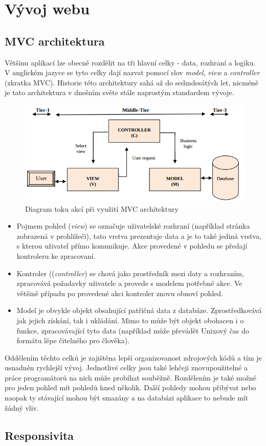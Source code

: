 \section{Vývoj webu}
\subsection{MVC architektura}
Většinu aplikací lze obecně rozdělit na tři hlavní celky - data, rozhraní a logiku. V anglickém jazyce se tyto celky dají nazvat pomocí slov \emph{model}, \emph{view} a \emph{controller} (zkratka MVC). Historie této architektury sahá až do sedmdesátých let, nicméně je tato architektura v dnešním světe stále naprostým standardem vývoje.

\begin{figure}[H]
	\centering
	\includegraphics[width=\textwidth]{images/mvc.png}
	\caption{Diagram toku akcí při využití MVC architektury}
	\label{mvc}
\end{figure}

\begin{itemize}
\item Pojmem pohled (\emph{view}) se označuje uživatelské rozhraní (například stránka zobrazená v prohlížeči), tato vrstva prezentuje data a je to také jediná vrstva, s kterou uživatel přímo komunikuje. Akce provedené v pohledu se předají kontroleru ke zpracovaní.
\item Kontroler ((\emph{controller}) se chová jako prostředník mezi daty a rozhraním, zpracovává požadavky uživatele a provede s modelem potřebné akce. Ve většině případu po provedené akci kontroler znovu obnoví pohled.
\item Model je obvykle objekt obsahující patřičná data z databáze. Zprostředkovává jak jejich získání, tak i ukládání. Mimo to může být objekt obohacen i o funkce, zpracovávající tyto data (například může převádět Unixový čas do formátu lépe čitelného pro člověka). 
\end{itemize}


Oddělením těchto celků je zajištěna lepší organizovanost zdrojových kódů a tím je usnadněn rychlejší vývoj. Jednotlivé celky jsou také lehčeji znovupoužitelné a práce programátorů na nich může probíhat souběžně. Rozdělením je také možné pro jeden pohled mít pohledů hned několik. Další pohledy mohou přibývat nebo naopak ty stávající mohou být smazány a na databázi aplikace to nebude mít žádný vliv.

\subsection{Responsivita}
\blindtext[2]